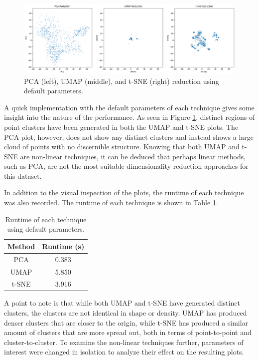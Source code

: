 \documentclass[12pt]{article}
\begin{document}
\begin{figure}[H]
    \centering
    \includegraphics[width=\textwidth]{Images/default_dimred.png}
    \caption{PCA (left), UMAP (middle), and t-SNE (right) reduction using default parameters.}
    \label{fig:default_dimred}
\end{figure}

\vspace{-0.5cm}

A quick implementation with the default parameters of each technique gives some insight into the nature of the performance. As seen in Figure \ref{fig:default_dimred}, distinct regions of point clusters have been generated in both the UMAP and t-SNE plots. The PCA plot, however, does not show any distinct clusters and instead shows a large cloud of points with no discernible structure. Knowing that both UMAP and t-SNE are non-linear techniques, it can be deduced that perhaps linear methods, such as PCA, are not the most suitable dimensionality reduction approaches for this dataset.

In addition to the visual inspection of the plots, the runtime of each technique was also recorded. The runtime of each technique is shown in Table \ref{tab:default_dimred}.

\begin{table}[H]
    \centering
    \begin{tabular}{|c|c|}
        \hline
        \textbf{Method} & \textbf{Runtime (s)} \\
        \hline
        PCA & 0.383  \\
        UMAP & 5.850 \\
        t-SNE & 3.916 \\
        \hline
    \end{tabular}
    \caption{Runtime of each technique using default parameters.}
    \label{tab:default_dimred}
\end{table}

\vspace{-0.5cm}

A point to note is that while both UMAP and t-SNE have generated distinct clusters, the clusters are not identical in shape or density. UMAP has produced denser clusters that are closer to the origin, while t-SNE has produced a similar amount of clusters that are more spread out, both in terms of point-to-point and cluster-to-cluster. To examine the non-linear techniques further, parameters of interest were changed in isolation to analyze their effect on the resulting plots. 
\end{document}
